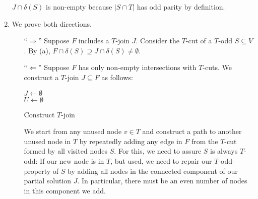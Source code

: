 \begin{aufgabe}
\begin{enumerate}[label=(\alph*)]
              $J \cap \delta(S)$ is non-empty because $|S \cap T|$ has odd parity by definition.
        \item We prove both directions.
              \begin{itemize}
                  \item[\enquote{$\Rightarrow$}] Suppose $F$ includes a $T$-join $J$.
                      Consider the $T$-cut of a $T$-odd $S \subseteq V$. By (a), $F \cap \delta(S) \supseteq J \cap \delta(S) \neq \emptyset$.
                  \item[\enquote{$\Leftarrow$}] Suppose $F$ has only non-empty intersections with $T$-cuts.
                      We construct a $T$-join $J \subseteq F$ as follows:
                      \\
                      \begin{algorithm}[H]
                          \SetAlgoLined
                          $J \leftarrow \emptyset$\\
                          $U \leftarrow \emptyset$\\
                          \caption{Construct $T$-join}
                      \end{algorithm} \noindent
                      We start from any unused node $v \in T$ and construct a path to another unused node
                      in $T$ by repeatedly adding any edge in $F$ from the $T$-cut formed by all visited nodes $S$.
                      For this, we need to assure $S$ is always $T$-odd:
                      If our new node is in $T$, but used, we need to repair our $T$-odd-property of $S$ by adding all
                      nodes in the connected component of our partial solution $J$. In particular, there must be an even number of nodes in this component we add.


\end{itemize}
\end{enumerate}
\end{aufgabe}

